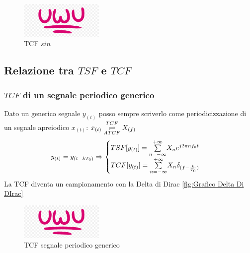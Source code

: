                 \begin{figure}[H]
                    \centering
                    \includegraphics[width=4cm]{media/uwu.png}
                    \caption{TCF $sin$}
                    \label{fig:TCF sin}
                \end{figure}

            \subsection{Relazione tra $TSF$ e $TCF$}
                \subsubsection{$TCF$ di un segnale periodico generico}\label{TCF di un segnale periodico generico}
                    Dato un generico segnale $y_{(t)}$ posso sempre scriverlo come periodicizzazione di un segnale apreiodico $x_{(t)}$:
                    $x_{(t)} \overunderset{TCF}{ATCF}{\rightleftharpoons} X_{(f)}$\\
                    
                    \[
                        y_{(t)} = y_{(t-kT_0)} \Rightarrow 
                        \begin{cases}
                            TSF[y_{(t)}] = \overunderset{+\infty}{n = -\infty}{\sum} X_n e^{j2\pi nf_0t}\nonumber \\
                            TCF[y_{(t)}] = \overunderset{+\infty}{n = -\infty}{\sum} X_n \delta_{(f-\frac{k}{T_0})} \nonumber 
                        \end{cases}
                    \]
                    La TCF diventa un campionamento con la Delta di Dirac \ref{fig:Grafico Delta Di DIrac}

                    \begin{figure}[H]
                        \centering
                        \includegraphics[width=4cm]{media/uwu.png}
                        \caption{TCF segnale periodico generico}
                        \label{fig:TCF segnale periodico generico}
                    \end{figure}

